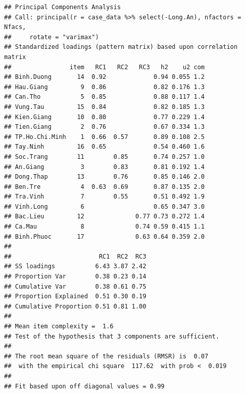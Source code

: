 \documentclass[../thesis.tex]{subfiles}
\begin{document}
\begin{verbatim}
## Principal Components Analysis
## Call: principal(r = case_data %>% select(-Long.An), nfactors = Nfacs, 
##     rotate = "varimax")
## Standardized loadings (pattern matrix) based upon correlation matrix
##                item   RC1   RC2   RC3   h2    u2 com
## Binh.Duong       14  0.92             0.94 0.055 1.2
## Hau.Giang         9  0.86             0.82 0.176 1.3
## Can.Tho           5  0.85             0.88 0.117 1.4
## Vung.Tau         15  0.84             0.82 0.185 1.3
## Kien.Giang       10  0.80             0.77 0.229 1.4
## Tien.Giang        2  0.76             0.67 0.334 1.3
## TP.Ho.Chi.Minh    1  0.66  0.57       0.89 0.108 2.5
## Tay.Ninh         16  0.65             0.54 0.460 1.6
## Soc.Trang        11        0.85       0.74 0.257 1.0
## An.Giang          3        0.83       0.81 0.192 1.4
## Dong.Thap        13        0.76       0.85 0.146 2.0
## Ben.Tre           4  0.63  0.69       0.87 0.135 2.0
## Tra.Vinh          7        0.55       0.51 0.492 1.9
## Vinh.Long         6                   0.65 0.347 3.0
## Bac.Lieu         12              0.77 0.73 0.272 1.4
## Ca.Mau            8              0.74 0.59 0.415 1.1
## Binh.Phuoc       17              0.63 0.64 0.359 2.0
## 
##                        RC1  RC2  RC3
## SS loadings           6.43 3.87 2.42
## Proportion Var        0.38 0.23 0.14
## Cumulative Var        0.38 0.61 0.75
## Proportion Explained  0.51 0.30 0.19
## Cumulative Proportion 0.51 0.81 1.00
## 
## Mean item complexity =  1.6
## Test of the hypothesis that 3 components are sufficient.
## 
## The root mean square of the residuals (RMSR) is  0.07 
##  with the empirical chi square  117.62  with prob <  0.019 
## 
## Fit based upon off diagonal values = 0.99
\end{verbatim}


\begin{Shaded}
	\begin{Highlighting}[]
		 \NormalTok{, }
		 \NormalTok{) }\SpecialCharTok{\%\textgreater{}\%} 
		 \NormalTok{, }
		 \NormalTok{)}
	\end{Highlighting}
\end{Shaded}
\end{document}
